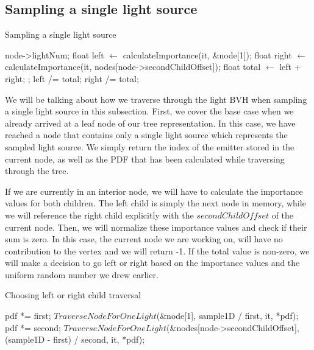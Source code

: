 \subsection{Sampling a single light source}
\label{subs:single}

\begin{algorithm}
	\caption{Sampling a single light source}
	\label{alg:sample1}
	\begin{algorithmic}[1] %
		\State \Return node->lightNum;
		\EndIf
		\State float left $\gets$ calculateImportance(it, \&node[1]);
		\State float right $\gets$ calculateImportance(it, nodes[node->secondChildOffset]);
		\State float total $\gets$ left + right;
		\State {};
		\EndIf
		\State left /= total;
		\State right /= total;
				\State <branch according to importance and sample1D>
		\EndProcedure
	\end{algorithmic}
\end{algorithm}

We will be talking about how we traverse through the light BVH when sampling a single light source in this subsection. First, we cover the base case when we already arrived at a leaf node of our tree representation. In this case, we have reached a node that contains only a single light source which represents the sampled light source. We simply return the index of the emitter stored in the current node, as well as the PDF that has been calculated while traversing through the tree.

If we are currently in an interior node, we will have to calculate the importance values for both children. The left child is simply the next node in memory, while we will reference the right child explicitly with the $secondChildOffset$ of the current node. Then, we will normalize these importance values and check if their sum is zero. In this case, the current node we are working on, will have no contribution to the vertex and we will return -1. If the total value is non-zero, we will make a decision to go left or right based on the importance values and the uniform random number we drew earlier.

\begin{algorithm}
	\caption{Choosing left or right child traversal}
	\label{alg:child}
	\begin{algorithmic}[1] %
		\State *pdf *= first;
		\State \Return $TraverseNodeForOneLight$(\&node[1], sample1D / first, it, *pdf);
		\Else
		\State *pdf *= second;
		\State \Return $TraverseNodeForOneLight$(\&nodes[node->secondChildOffset], (sample1D - first) / second, it, *pdf);
		\EndIf
	\end{algorithmic}
\end{algorithm}

